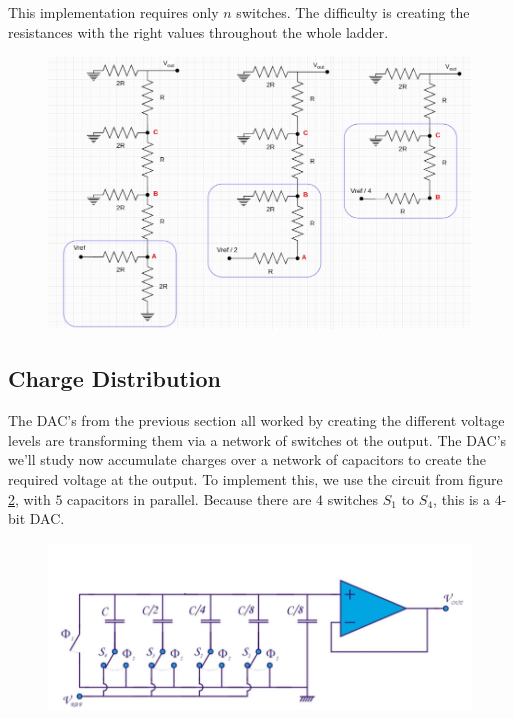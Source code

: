 This implementation requires only $n$ switches. The difficulty is creating the resistances with the  right values throughout the whole ladder.
\begin{figure}[h!]
	\centering
	\includegraphics[width=14cm]{figures/ch18/dac5.jpg}
	\caption{}
	\label{fig:dac5}
\end{figure}

\subsection{Charge Distribution}
\label{sec:charge_distribution}
The DAC's from the previous section all worked by creating the different voltage levels are transforming them via a network of switches ot the output. The DAC's we'll study now accumulate charges over a network of capacitors to create the required voltage at the output. To implement this, we use the circuit from figure \ref{fig:dac6}, with $5$ capacitors in parallel. Because there are $4$ switches $S_1$ to $S_4$, this is a $4$-bit DAC.\\

\begin{figure}[h!]
	\centering
	\includegraphics[width=12cm]{figures/ch18/dac6.jpg}
	\caption{}
	\label{fig:dac6}
\end{figure}

